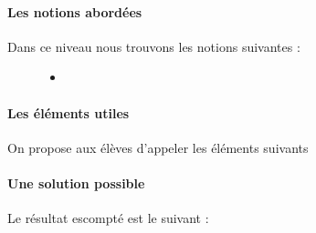 \documentclass[letterpaper,10pt,french]{sphinxmanual}
\begin{document}
\paragraph{Les notions abordées}
\label{\detokenize{decouverte/de6faces-python3:les-notions-abordees}}\begin{description}
\item[{Dans ce niveau nous trouvons les notions suivantes :}] \leavevmode\begin{itemize}
\item {} 
\end{itemize}

\end{description}


\paragraph{Les éléments utiles}
\label{\detokenize{decouverte/de6faces-python3:les-elements-utiles}}
On propose aux élèves d’appeler les éléments suivants


\paragraph{Une solution possible}
\label{\detokenize{decouverte/de6faces-python3:une-solution-possible}}
Le résultat escompté est le suivant :
\end{document}
